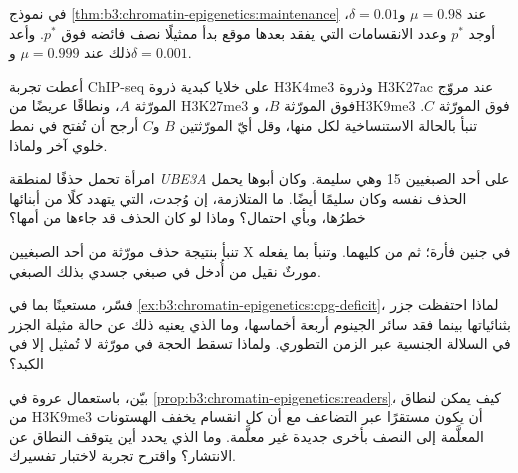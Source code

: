 \begin{exercise}[$\star\star$]\label{exo:b3:chromatin-epigenetics:6}
في نموذج \cref{thm:b3:chromatin-epigenetics:maintenance} عند
$\mu = 0.98$ و$\delta = 0.01$، أوجد $p^{*}$ وعدد الانقسامات التي
يفقد بعدها موقع بدأ ممثيلًا نصف فائضه فوق $p^{*}$. وأعد ذلك عند
$\mu = 0.999$ و$\delta = 0.001$.
\end{exercise}

\begin{exercise}[$\star\star$]\label{exo:b3:chromatin-epigenetics:7}
أعطت تجربة ChIP-seq على خلايا كبدية ذروة H3K4me3 وذروة H3K27ac عند
مروّج المورّثة $A$، ونطاقًا عريضًا من H3K27me3 فوق المورّثة $B$،
وH3K9me3 فوق المورّثة $C$. تنبأ بالحالة الاستنساخية لكل منها، وقل
أيّ المورّثتين $B$ و$C$ أرجح أن تُفتح في نمط خلوي آخر ولماذا.
\end{exercise}

\begin{exercise}[$\star\star$]\label{exo:b3:chromatin-epigenetics:8}
امرأة تحمل حذفًا لمنطقة \emph{UBE3A} على أحد الصبغيين 15 وهي سليمة.
وكان أبوها يحمل الحذف نفسه وكان سليمًا أيضًا. ما المتلازمة، إن وُجدت،
التي يتهدد كلًا من أبنائها خطرُها، وبأي احتمال؟ وماذا لو كان الحذف
قد جاءها من أمها؟
\end{exercise}

\begin{exercise}[$\star\star$]\label{exo:b3:chromatin-epigenetics:9}
تنبأ بنتيجة حذف مورّثة \emph{} من أحد الصبغيين X في جنين فأرة؛
ثم من كليهما. وتنبأ بما يفعله مورثٌ نقيل من \emph{} أُدخل في
صبغي جسدي بذلك الصبغي.
\end{exercise}

\begin{exercise}[$\star\star\star$]\label{exo:b3:chromatin-epigenetics:10}
فسّر، مستعينًا بما في \cref{ex:b3:chromatin-epigenetics:cpg-deficit}،
لماذا احتفظت جزر  بثنائياتها بينما فقد سائر الجينوم أربعة أخماسها،
وما الذي يعنيه ذلك عن حالة مثيلة الجزر في السلالة الجنسية عبر الزمن
التطوري. ولماذا تسقط الحجة في مورّثة لا تُمثيل إلا في الكبد؟
\end{exercise}

\begin{exercise}[$\star\star\star$]\label{exo:b3:chromatin-epigenetics:11}
بيّن، باستعمال عروة   في
\cref{prop:b3:chromatin-epigenetics:readers}، كيف يمكن لنطاق من
H3K9me3 أن يكون مستقرًا عبر التضاعف مع أن كل انقسام يخفف الهستونات
المعلَّمة إلى النصف بأخرى جديدة غير معلَّمة. وما الذي يحدد أين يتوقف
النطاق عن الانتشار؟ واقترح تجربة لاختبار تفسيرك.
\end{exercise}


